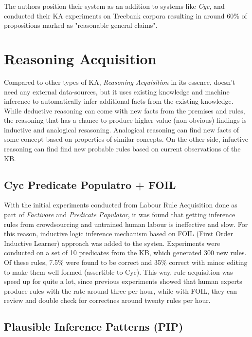 The authors position their system as an addition to systems like \emph{Cyc}, and
conducted their KA experiments on Treebank corpora resulting in around 60\% of
propositions marked as "reasonable general claims"\parencite{Schubert2003}. 

\section{Reasoning Acquisition}
Compared to other types of KA, \emph{Reasoning Acquisition} in its essence,
doesn't need any external data-sources, but it uses existing knowledge and
machine inference to automatically infer additional facts from the existing
knowledge. While deductive reasoning can come with new facts from the premises 
and rules, the reasoning that has a chance to produce higher value (non obvious)
findings is inductive and analogical resasoning. Analogical reasoning can find
new facts of some concept based on properties of similar concepts. On the other
side, infuctive reasoning can find find new probable rules based on current 
observations of the KB.

\subsection {Cyc Predicate Populatro + FOIL}
With the initial experiments conducted from Labour Rule Acquisition done as part
of \emph{Factivore} and \emph{Predicate Populator}\parencite{Witbrock2005}, it 
was found that getting inference rules from crowdsourcing and untrained
human labour is ineffective and slow. For this reason, inductive logic 
inference mechanism based on FOIL (First Order Inductive Learner) approach
\parencite{Quinlan1995} was added to the systen. Experiments were conducted on
a set of 10 predicates from the KB, which generated 300 new rules. Of these
rules, 7.5\% were found to be correct and 35\% correct with minor editing to
make them well formed (assertible to Cyc). This way, rule acquisition was speed
up for quite a lot, since previous experiments showed that human experts produce
rules with the rate around three per hour, while with FOIL, they can review
and double check for correctnes around twenty rules per hour.

\subsection {Plausible Inference Patterns (PIP)}


